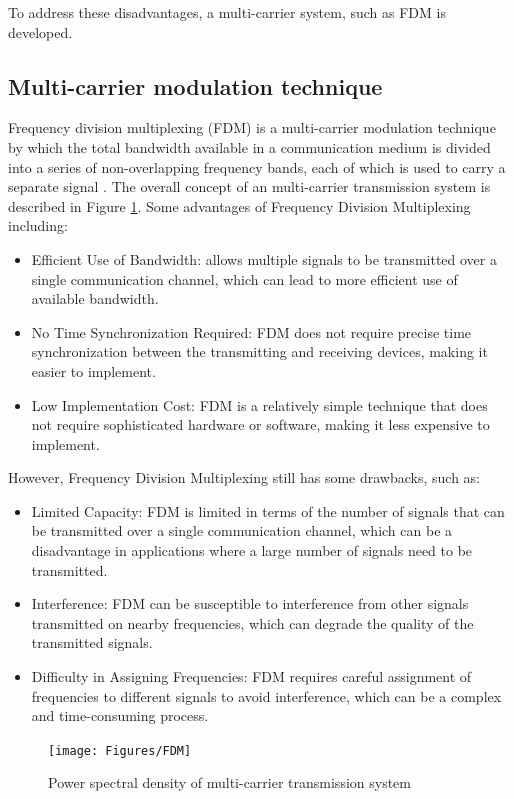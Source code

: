 To address these disadvantages, a multi-carrier system, such as FDM is developed.

\subsection{Multi-carrier modulation technique}

Frequency division multiplexing (FDM) is a multi-carrier modulation technique by which the total bandwidth available in a communication medium is divided into a series of non-overlapping frequency bands, each of which is used to carry a separate signal \cite{b2}. The overall concept of an multi-carrier transmission system is described in Figure \ref{fig:FDM}. Some advantages of Frequency Division Multiplexing including:
\begin{itemize}
    \item Efficient Use of Bandwidth: allows multiple signals to be transmitted over a single communication channel, which can lead to more efficient use of available bandwidth.
    \item No Time Synchronization Required: FDM does not require precise time synchronization between the transmitting and receiving devices, making it easier to implement.
    \item Low Implementation Cost: FDM is a relatively simple technique that does not require sophisticated hardware or software, making it less expensive to implement.
\end{itemize}
However, Frequency Division Multiplexing still has some drawbacks, such as: 
\begin{itemize}
    \item Limited Capacity: FDM is limited in terms of the number of signals that can be transmitted over a single communication channel, which can be a disadvantage in applications where a large number of signals need to be transmitted.
    \item Interference: FDM can be susceptible to interference from other signals transmitted on nearby frequencies, which can degrade the quality of the transmitted signals.
    \item Difficulty in Assigning Frequencies: FDM requires careful assignment of frequencies to different signals to avoid interference, which can be a complex and time-consuming process.
\end{itemize}

\begin{figure}[htbp]
    \centering
    \texttt{[image: Figures/FDM]}
    \caption{Power spectral density of multi-carrier transmission system}
    \label{fig:FDM}
\end{figure}

